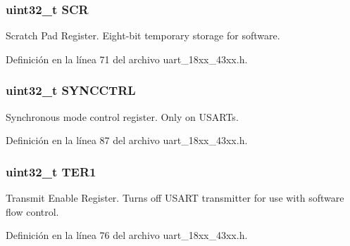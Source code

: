 \subsubsection[{\texorpdfstring{S\+CR}{SCR}}]{ uint32\+\_\+t S\+CR}\hypertarget{struct_l_p_c___u_s_a_r_t___t_a64a95891ad3e904dd5548112539c1c98}{}\label{struct_l_p_c___u_s_a_r_t___t_a64a95891ad3e904dd5548112539c1c98}
Scratch Pad Register. Eight-\/bit temporary storage for software. 

Definición en la línea 71 del archivo uart\+\_\+18xx\+\_\+43xx.\+h.

\subsubsection[{\texorpdfstring{S\+Y\+N\+C\+C\+T\+RL}{SYNCCTRL}}]{ uint32\+\_\+t S\+Y\+N\+C\+C\+T\+RL}\hypertarget{struct_l_p_c___u_s_a_r_t___t_a9185268c32e68e69d4cc067e1fb01d37}{}\label{struct_l_p_c___u_s_a_r_t___t_a9185268c32e68e69d4cc067e1fb01d37}
Synchronous mode control register. Only on U\+S\+A\+R\+Ts. 

Definición en la línea 87 del archivo uart\+\_\+18xx\+\_\+43xx.\+h.

\subsubsection[{\texorpdfstring{T\+E\+R1}{TER1}}]{ uint32\+\_\+t T\+E\+R1}\hypertarget{struct_l_p_c___u_s_a_r_t___t_ad1574eb815427899237323c62ec6ff1a}{}\label{struct_l_p_c___u_s_a_r_t___t_ad1574eb815427899237323c62ec6ff1a}
Transmit Enable Register. Turns off U\+S\+A\+RT transmitter for use with software flow control. 

Definición en la línea 76 del archivo uart\+\_\+18xx\+\_\+43xx.\+h.

